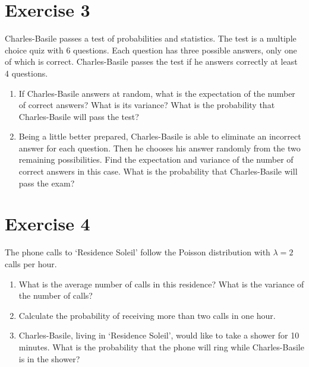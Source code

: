 \documentclass[12pt,thmsa]{article}\usepackage[]{graphicx}\usepackage[]{color}
\begin{document}
\newpage

\section*{Exercise 3}

Charles-Basile passes a test of probabilities and statistics. The test is a multiple choice quiz with 6 questions. Each question has three possible answers, only one of which is correct. Charles-Basile passes the test if he answers correctly at least 4 questions.


\begin{enumerate}%
\item If Charles-Basile answers at random, what is the expectation of the number of correct answers?
What is its variance? What is the probability that Charles-Basile will pass the test?

\item Being a little better prepared, Charles-Basile is able to eliminate an incorrect answer for each question. Then he chooses his answer randomly from the two remaining possibilities.
Find the expectation and variance of the number of correct answers in this case.
What is the probability that Charles-Basile will pass the exam?

\end{enumerate}





\section*{Exercise 4}

The phone calls to `Residence Soleil' follow the Poisson distribution with $\lambda = 2$ calls per hour.
\begin{enumerate}%
\item What is the average number of calls in this residence? What is the variance of the number of calls?
\item Calculate the probability of receiving more than two calls in one hour.

\item Charles-Basile, living in `Residence Soleil', would like to take a shower for 10 minutes.
What is the probability that the phone will ring while Charles-Basile is in the shower?

\end{enumerate}
\end{document}
